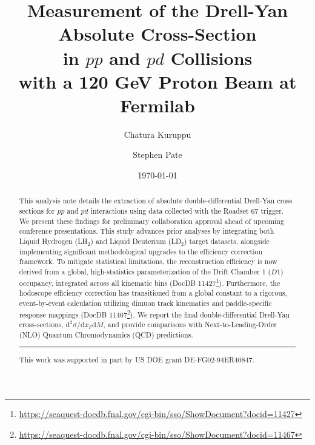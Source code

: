 \documentclass[11pt]{article}
\newcommand{\diffd}{\mathrm{d}}
\begin{document}
\linenumbers

\title{\textbf{Measurement of the Drell-Yan Absolute Cross-Section\\ in $pp$ and $pd$ Collisions\\ with a 120 GeV Proton Beam at Fermilab}}
\author{Chatura Kuruppu}
\author{Stephen Pate}
\date{\today}
\maketitle

\begin{abstract}
This analysis note details the extraction of absolute double-differential Drell-Yan cross sections for $pp$ and $pd$ interactions using data collected with the Roadset 67 trigger. We present these findings for preliminary collaboration approval ahead of upcoming conference presentations. This study advances prior analyses by integrating both Liquid Hydrogen (LH$_2$) and Liquid Deuterium (LD$_2$) target datasets, alongside implementing significant methodological upgrades to the efficiency correction framework. To mitigate statistical limitations, the reconstruction efficiency is now derived from a global, high-statistics parameterization of the Drift Chamber 1 ($D1$) occupancy, integrated across all kinematic bins (DocDB 11427\footnote{\url{https://seaquest-docdb.fnal.gov/cgi-bin/sso/ShowDocument?docid=11427}}). Furthermore, the hodoscope efficiency correction has transitioned from a global constant to a rigorous, event-by-event calculation utilizing dimuon track kinematics and paddle-specific response mappings (DocDB 11467\footnote{\url{https://seaquest-docdb.fnal.gov/cgi-bin/sso/ShowDocument?docid=11467}}). We report the final double-differential Drell-Yan cross-sections, $\diffd^{2}\sigma/\diffd x_{F}\diffd M$, and provide comparisons with Next-to-Leading-Order (NLO) Quantum Chromodynamics (QCD) predictions.

\vspace{1em}
\hrule
\vspace{1em}
\footnotesize{This work was supported in part by US DOE grant DE-FG02-94ER40847.}
\end{abstract}

\clearpage

\tableofcontents
\clearpage
\listoffigures
\clearpage
\listoftables
\clearpage
\end{document}
